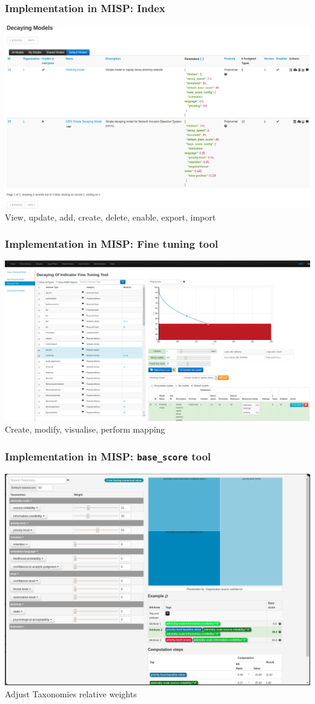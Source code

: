 \begin{frame}
    \frametitle{Implementation in MISP: Index}
    \includegraphics[width=1.00\linewidth]{decaying-index.png}
    View, update, add, create, delete, enable, export, import
\end{frame}

\begin{frame}
    \frametitle{Implementation in MISP: Fine tuning tool}
    \includegraphics[width=1.00\linewidth]{decaying-tool.png}
    Create, modify, visualise, perform mapping
\end{frame}

\begin{frame}
    \frametitle{Implementation in MISP: \texttt{base\_score} tool}
    \includegraphics[width=1.00\linewidth]{decaying-basescore.png}
    Adjust Taxonomies relative weights
\end{frame}

